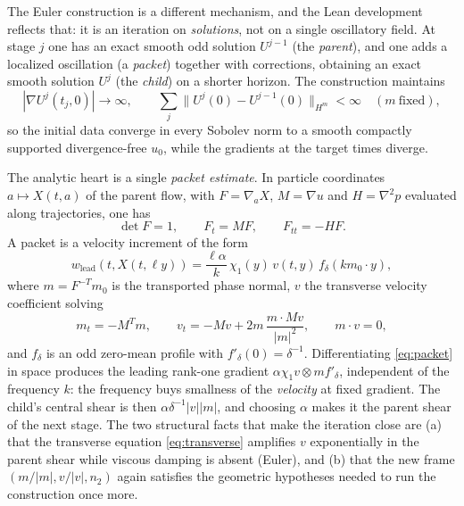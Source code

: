 The Euler construction is a different mechanism, and the Lean development reflects that: it
is an iteration on \emph{solutions}, not on a single oscillatory field. At stage $j$ one has
an exact smooth odd solution $U^{j-1}$ (the \emph{parent}), and one adds a localized
oscillation (a \emph{packet}) together with corrections, obtaining an exact smooth solution
$U^j$ (the \emph{child}) on a shorter horizon. The construction maintains
\begin{equation}
  |\nabla U^j(t_j,0)|\longrightarrow\infty,
  \qquad
  \sum_j \|U^j(0)-U^{j-1}(0)\|_{H^m}<\infty \quad (m\ \text{fixed}),
  \label{eq:euler-iteration}
\end{equation}
so the initial data converge in every Sobolev norm to a smooth compactly supported
divergence-free $u_0$, while the gradients at the target times diverge.

The analytic heart is a single \emph{packet estimate}. In particle coordinates
$a\mapsto X(t,a)$ of the parent flow, with $F=\nabla_aX$, $M=\nabla u$ and $H=\nabla^2p$
evaluated along trajectories, one has
\begin{equation}
  \det F=1,\qquad F_t=MF,\qquad F_{tt}=-HF .
\end{equation}
A packet is a velocity increment of the form
\begin{equation}
  w_{\text{lead}}(t,X(t,\ell y)) = \frac{\ell\alpha}{k}\,\chi_1(y)\,v(t,y)\,f_\delta(km_0\cdot y),
  \label{eq:packet}
\end{equation}
where $m=F^{-T}m_0$ is the transported phase normal, $v$ the transverse velocity
coefficient solving
\begin{equation}
  m_t=-M^{T}m,\qquad v_t=-Mv+2m\,\frac{m\cdot Mv}{|m|^2},\qquad m\cdot v=0,
  \label{eq:transverse}
\end{equation}
and $f_\delta$ is an odd zero-mean profile with $f'_\delta(0)=\delta^{-1}$. Differentiating
\eqref{eq:packet} in space produces the leading rank-one gradient
$\alpha\chi_1 v\otimes m f'_\delta$, independent of the frequency $k$: the frequency buys
smallness of the \emph{velocity} at fixed gradient. The child's central shear is then
$\alpha\delta^{-1}|v||m|$, and choosing $\alpha$ makes it the parent shear of the next
stage. The two structural facts that make the iteration close are (a) that the transverse
equation \eqref{eq:transverse} amplifies $v$ exponentially in the parent shear while viscous
damping is absent (Euler), and (b) that the new frame $(m/|m|,v/|v|,n_2)$ again satisfies the
geometric hypotheses needed to run the construction once more.

